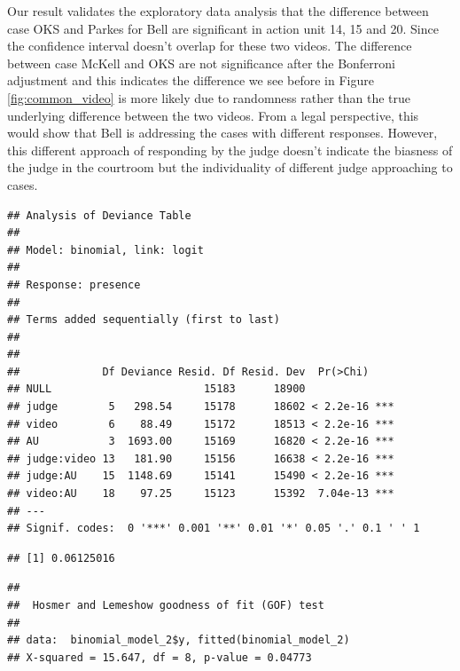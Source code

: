 \documentclass{monashthesis}
\begin{document}
Our result validates the exploratory data analysis that the difference between case OKS and Parkes for Bell are significant in action unit 14, 15 and 20. Since the confidence interval doesn't overlap for these two videos. The difference between case McKell and OKS are not significance after the Bonferroni adjustment and this indicates the difference we see before in Figure \ref{fig:common_video} is more likely due to randomness rather than the true underlying difference between the two videos. From a legal perspective, this would show that Bell is addressing the cases with different responses. However, this different approach of responding by the judge doesn't indicate the biasness of the judge in the courtroom but the individuality of different judge approaching to cases.

\begin{verbatim}
## Analysis of Deviance Table
## 
## Model: binomial, link: logit
## 
## Response: presence
## 
## Terms added sequentially (first to last)
## 
## 
##             Df Deviance Resid. Df Resid. Dev  Pr(>Chi)    
## NULL                        15183      18900              
## judge        5   298.54     15178      18602 < 2.2e-16 ***
## video        6    88.49     15172      18513 < 2.2e-16 ***
## AU           3  1693.00     15169      16820 < 2.2e-16 ***
## judge:video 13   181.90     15156      16638 < 2.2e-16 ***
## judge:AU    15  1148.69     15141      15490 < 2.2e-16 ***
## video:AU    18    97.25     15123      15392  7.04e-13 ***
## ---
## Signif. codes:  0 '***' 0.001 '**' 0.01 '*' 0.05 '.' 0.1 ' ' 1
\end{verbatim}

\begin{verbatim}
## [1] 0.06125016
\end{verbatim}

\begin{verbatim}
## 
##  Hosmer and Lemeshow goodness of fit (GOF) test
## 
## data:  binomial_model_2$y, fitted(binomial_model_2)
## X-squared = 15.647, df = 8, p-value = 0.04773
\end{verbatim}
\end{document}
